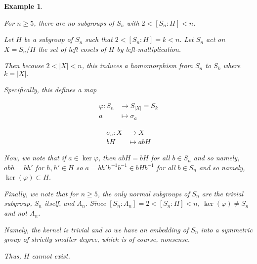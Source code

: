 \documentclass[12pt]{Qual}
\newtheorem{example}{Example}
\begin{document}
\begin{example}
$\,$
\begin{framed}
For $n\ge 5$, there are no subgroups of $S_n$ with $2<[S_n:H]<n$.
\end{framed}

Let $H$ be a subgroup of $S_n$ such that $2<[S_n:H]=k<n$. Let $S_n$ act on $X=S_n/H$ the set of left cosets of $H$ by left-multiplication.

Then because $2<|X|<n$, this induces a homomorphism from $S_n$ to $S_k$ where $k=|X|.$

Specifically, this defines a map
\vspace{-0.35cm}
\begin{center}
\begin{minipage}{0.4\textwidth}
\begin{align*}
    \varphi:S_n&\to S_{|X|}=S_k\\
    a&\mapsto \sigma_a
\end{align*}
\end{minipage}\begin{minipage}{0.4\textwidth}
\begin{align*}
    \sigma_a:X&\to X\\
    bH&\mapsto abH
\end{align*}
\end{minipage}
\end{center}
\vspace{0.15cm}

Now, we note that if $a\in\ker\varphi$, then $abH=bH$ for all $b\in S_n$ and so namely, $abh=bh'$ for $h,h'\in H$ so $a=bh'h^{-1}b^{-1}\in bHb^{-1}$ for all $b\in S_n$ and so namely, $\ker(\varphi)\subset H$.

Finally, we note that for $n\ge 5$, the only normal subgroups of $S_n$ are the trivial subgroup, $S_n$ itself, and $A_n$. Since $[S_n:A_n]=2<[S_n:H]<n$, $\ker(\varphi)\not=S_n$ and not $A_n$.

Namely, the kernel is trivial and so we have an embedding of $S_n$ into a symmetric group of strictly smaller degree, which is of course, nonsense.

Thus, $H$ cannot exist.
\end{example}
\vspace{0.5cm}
\newpage
\end{document}
